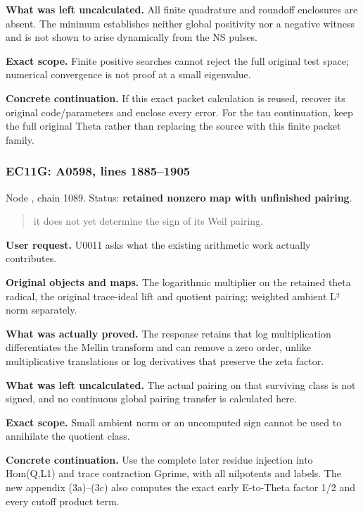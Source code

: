 \textbf{What was left uncalculated.} All finite quadrature and roundoff
enclosures are absent. The minimum establishes neither global positivity
nor a negative witness and is not shown to arise dynamically from the NS
pulses.

\textbf{Exact scope.} Finite positive searches cannot reject the full
original test space; numerical convergence is not proof at a small
eigenvalue.

\textbf{Concrete continuation.} If this exact packet calculation is
reused, recover its original code/parameters and enclose every error.
For the tau continuation, keep the full original Theta rather than
replacing the source with this finite packet family.

\subsubsection{EC11G: A0598, lines
1885--1905}\label{TranscriptLedgerStage:ec11g-a0598-lines-18851905}

Node \protect{}, chain 1089.
Status: \textbf{retained nonzero map with unfinished pairing}.

\begin{quote}
it does not yet determine the sign of its Weil pairing.
\end{quote}

\textbf{User request.} U0011 asks what the existing arithmetic work
actually contributes.

\textbf{Original objects and maps.} The logarithmic multiplier on the
retained theta radical, the original trace-ideal lift and quotient
pairing; weighted ambient L² norm separately.

\textbf{What was actually proved.} The response retains that log
multiplication differentiates the Mellin transform and can remove a zero
order, unlike multiplicative translations or log derivatives that
preserve the zeta factor.

\textbf{What was left uncalculated.} The actual pairing on that
surviving class is not signed, and no continuous global pairing transfer
is calculated here.

\textbf{Exact scope.} Small ambient norm or an uncomputed sign cannot be
used to annihilate the quotient class.

\textbf{Concrete continuation.} Use the complete later residue injection
into Hom(Q,L1) and trace contraction Gprime, with all nilpotents and
labels. The new appendix (3a)--(3c) also computes the exact early
E-to-Theta factor 1/2 and every cutoff product term.

